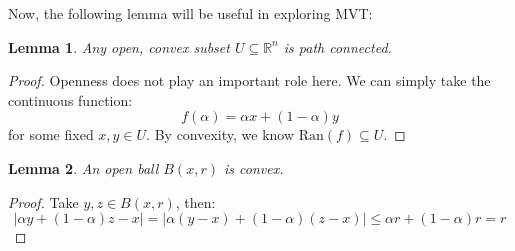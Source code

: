 \documentclass[10pt,letterpaper]{article} %
\newtheorem{lem}{Lemma}[section]
\newtheorem{defn}{Definition}[section]
\begin{document}

Now, the following lemma will be useful in exploring MVT:

\begin{lem}
Any open, convex subset $U \subseteq \mathbb{R}^n$ is path connected.
\end{lem}
\begin{proof}
Openness does not play an important role here. We can simply take the continuous function:
\begin{equation*}
f(\alpha) = \alpha x + (1-\alpha)y
\end{equation*}
for some fixed $x, y \in U$. By convexity, we know $\text{Ran}(f) \subseteq U$.
\end{proof}
\begin{lem}
An open ball $B(x, r)$ is convex.
\end{lem}
\begin{proof}
Take $y, z \in B(x, r)$, then:
\begin{equation*}
|\alpha y + (1-\alpha)z - x| = |\alpha(y-x) + (1-\alpha)(z-x)| \leqslant \alpha r + (1-\alpha) r = r
\end{equation*}
\end{proof}
\end{document}
